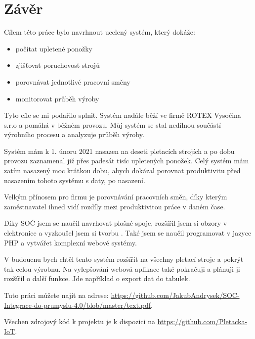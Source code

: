 \chapter*{Závěr}

Cílem této práce bylo navrhnout ucelený systém, který dokáže:

\begin{itemize}
    \item počítat upletené ponožky
    \item zjišťovat poruchovost strojů
    \item porovnávat jednotlivé pracovní směny
    \item monitorovat průběh výroby
\end{itemize}

Tyto cíle se mi podařilo splnit. Systém nadále běží ve firmě ROTEX Vysočina s.r.o\cite{ROTEX} a pomáhá v běžném provozu.
Můj systém se stal nedílnou součástí výrobního procesu a analyzuje průběh výroby.

Systém mám k 1. únoru 2021 nasazen na deseti pletacích strojích a po dobu provozu zaznamenal již přes padesát tisíc upletených ponožek.
Celý systém mám zatím nasazený moc krátkou dobu, abych dokázal porovnat produktivitu před nasazením tohoto systému s daty, po nasazení.

Velkým přínosem pro firmu je porovnávání pracovních směn, díky kterým zaměstnavatel ihned vidí rozdíly mezi produktivitou práce v daném čase.

Díky SOČ jsem se naučil navrhovat plošné spoje, rozšířil jsem si obzory v elektronice a vyzkoušel jsem si tvorbu . 
Také jsem se naučil programovat v jazyce PHP a vytvářet komplexní webové systémy.

V budoucnu bych chtěl tento systém rozšířit na všechny pletací stroje a pokrýt tak celou výrobnu.
Na vylepšování webová aplikace také pokračuji a plánuji ji rozšířil o další funkce. Jde například o export dat do tabulek.

Tuto práci můžete najít na adrese: \url{https://github.com/JakubAndrysek/SOC-Integrace-do-prumyslu-4.0/blob/master/text.pdf}.

Všechen zdrojový kód k projektu je k dispozici na \url{https://github.com/Pletacka-IoT}.


\newpage